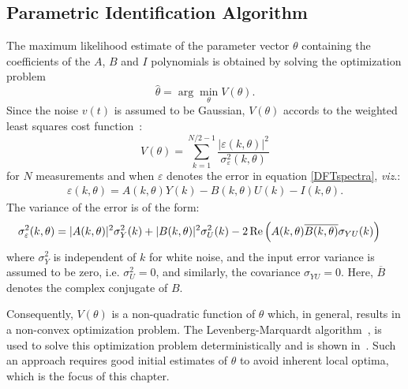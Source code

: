\subsection{Parametric Identification Algorithm}\label{se:paramIdentAlgo}

The maximum likelihood estimate of the parameter vector $\theta$  containing the coefficients of the $A$, $B$ and $I$  polynomials is obtained by solving the optimization problem
\begin{equation}
  \hat{\theta} = \arg\min_\theta V(\theta) \text{.}
\end{equation}
Since the noise $v(t)$ is assumed to be Gaussian, $V(\theta)$ accords to the weighted least squares cost function~\citep[Section 9.11]{Pintelon2012}:
\begin{equation}\label{eq:MLEcf}
V(\theta) = \sum_{k=1}^{N/2-1}\frac{|\varepsilon(k,\theta)|^2}{\sigma_\varepsilon^2(k,\theta)}
\end{equation}
for $N$ measurements and when $\varepsilon$ denotes the error in equation \eqref{DFTspectra},  \emph{viz}.:
\begin{align}
\varepsilon(k,\theta) = A(k,\theta)Y(k) - B(k,\theta)U(k) - I(k,\theta)\text{.}
\end{align}
The variance of the error is of the form:
\begin{equation}\label{eq:sigmaEps}
\begin{split}
\sigma_\varepsilon^2(k,\theta) 
  &=  |A(k,\theta)|^2\sigma_Y^2(k) 
   +  |B(k,\theta)|^2\sigma_U^2(k)
  - 2\operatorname{\mathrm{Re}} \left( A(k,\theta) \overline{B(k,\theta)} \sigma_{YU}(k) \right)
\end{split}
\end{equation}
where $\sigma_Y^2$ is independent of $k$ for white noise, and the input error variance is assumed to be zero, i.e. $\sigma^2_U=0$, and similarly, the covariance $\sigma_{YU} = 0$.
Here, $\overline{B}$ denotes the complex conjugate of $B$.

Consequently, $V(\theta)$ is a non-quadratic function of $\theta$ which, in general, results in a non-convex optimization problem. 
The Levenberg-Marquardt algorithm~\citep{Marquardt1963}, is used to solve this optimization problem deterministically and is shown in~.
Such an approach requires good initial estimates of $\theta$ to avoid inherent local optima, which is the focus of this chapter.

